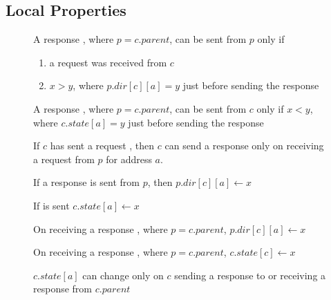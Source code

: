 \subsection{Local Properties}
\label{sec:localProperties}


\begin{figure}\small
\begin{inv}
A response , where $p = c.parent$, can be sent from $p$ only
if
\begin{enumerate}
\item a request  was received from $c$
\item $x > y$, where $p.dir[c][a] = y$ just before sending the response
\end{enumerate}
\label{pSendRespPre}
\end{inv}
\begin{inv}
A response , where $p = c.parent$, can be sent from $c$ only
if $x < y$, where $c.state[a] = y$ just before sending the
response\label{pSendRespPre1}
\end{inv}
\begin{inv}
If $c$ has sent a request , then $c$ can send a response
 only on receiving a request from $p$ for address $a$.
\label{cSendRespPre2}
\end{inv}
%
\begin{inv}
If a response  is sent from $p$, then $p.dir[c][a] \gets x$\label{cSendRespPost}
\end{inv}
\begin{inv}
If  is sent $c.state[a] \gets x$\label{pSendRespPost}
\end{inv}
\begin{inv}
On receiving a response , where $p = c.parent$, $p.dir[c][a]
\gets x$\label{pRecvResp}
\end{inv}
\begin{inv}
On receiving a response , where $p = c.parent$, $c.state[c]
\gets x$\label{cRecvResp}
\end{inv}
\begin{inv}
$c.state[a]$ can change only on $c$ sending a response to or receiving a
response from $c.parent$\label{cState}
\end{inv}

\end{figure}

